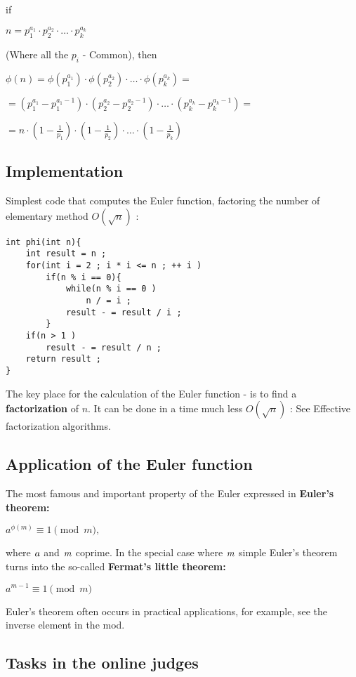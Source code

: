 if

$n=p_{1}^{a_{1}}\cdot p_{2}^{a_{2}}\cdot\ldots\cdot p_{k}^{a_{k}}$

(Where all the $p_i$ - Common), then

$\phi(n)=\phi(p_{1}^{a_{1}})\cdot\phi(p_{2}^{a_{2}})\cdot\ldots\cdot\phi(p_{k}^{a_{k}})=$

$=(p_{1}^{a_{1}}-p_{1}^{a_{1}-1})\cdot(p_{2}^{a_{2}}-p_{2}^{a_{2}-1})\cdot\ldots\cdot(p_{k}^{a_{k}}-p_{k}^{a_{k}-1})=$

$=n\cdot(1-\frac{1}{p_{1}})\cdot(1-\frac{1}{p_{2}})\cdot\ldots\cdot(1-\frac{1}{p_{k}})$

\subsection{ Implementation }

Simplest code that computes the Euler function, factoring the number of elementary method $O (\sqrt n)$ :

\begin{verbatim}
int phi(int n){
    int result = n ;
    for(int i = 2 ; i * i <= n ; ++ i )
        if(n % i == 0){
            while(n % i == 0 )
                n / = i ;
            result - = result / i ;
        }
    if(n > 1 )
        result - = result / n ;
    return result ;
} 
\end{verbatim}
The key place for the calculation of the Euler function - is to find a \textbf{factorization} of $n$. It can be done in a time much less $O (\sqrt {n})$ : See Effective factorization algorithms.

\subsection{ Application of the Euler function }

The most famous and important property of the Euler expressed in \textbf{Euler's theorem:}

$a ^ {\phi (m)} \equiv 1 \pmod m,$

where $\it a$ and $\it m$ coprime.
In the special case where $\it m$ simple Euler's theorem turns into the so-called \textbf{Fermat's little theorem:}

$a ^ {m-1} \equiv 1 \pmod m$

Euler's theorem often occurs in practical applications, for example, see the inverse element in the mod.

\subsection{ Tasks in the online judges }

